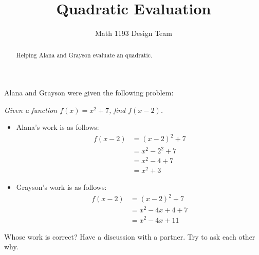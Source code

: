 \documentclass[noauthor]{ximera}
\title{Quadratic Evaluation}
\author{Math 1193 Design Team}
\begin{document}
\begin{abstract}
    Helping Alana and Grayson evaluate an quadratic.
\end{abstract}
\maketitle

Alana and Grayson were given the following problem:

\textit{Given a function \(f(x) = x^2 + 7\), find \(f(x - 2)\).}

\begin{itemize}
    \item Alana's work is as follows:
    \begin{align*}
        f(x - 2) & = (x - 2)^2 + 7 \\
        & = x^2 - 2^2 + 7 \\
        & = x^2 - 4 + 7 \\
        & = x^2 + 3
    \end{align*}
    \item Grayson's work is as follows:
    \begin{align*}
        f(x - 2) & = (x - 2)^2 + 7 \\
        & = x^2 - 4x + 4 + 7 \\
        & = x^2 - 4x + 11
    \end{align*}
\end{itemize}

Whose work is correct? Have a discussion with a partner. Try to ask
each other why.
\end{document}
